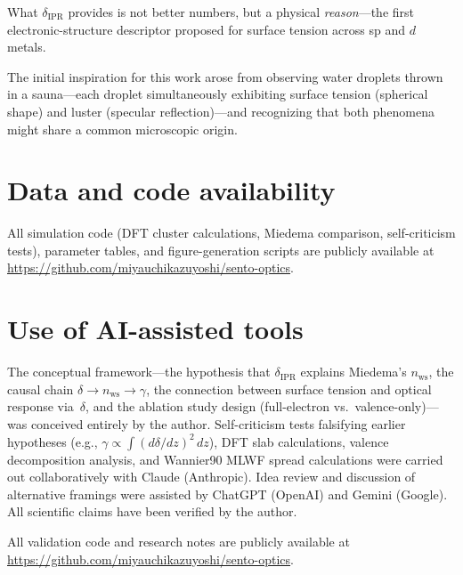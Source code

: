 \documentclass[twocolumn,showpacs,preprintnumbers,amsmath,amssymb,prb]{revtex4-2}
\begin{document}
What $\delta_\mathrm{IPR}$ provides is not better numbers,
but a physical \emph{reason}---the first electronic-structure
descriptor proposed for surface tension across sp and $d$ metals.


\begin{acknowledgments}
The initial inspiration for this work arose from observing
water droplets thrown in a sauna---each droplet simultaneously
exhibiting surface tension (spherical shape) and luster
(specular reflection)---and recognizing that both phenomena
might share a common microscopic origin.
\end{acknowledgments}


\section*{Data and code availability}

All simulation code (DFT cluster calculations, Miedema
comparison, self-criticism tests), parameter tables, and
figure-generation scripts are publicly available at
\url{https://github.com/miyauchikazuyoshi/sento-optics}.


\section*{Use of AI-assisted tools}

The conceptual framework---the hypothesis that
$\delta_\mathrm{IPR}$ explains Miedema's $n_\mathrm{ws}$,
the causal chain $\delta \to n_\mathrm{ws} \to \gamma$,
the connection between surface tension and optical
response via~$\delta$, and the ablation study design
(full-electron vs.\ valence-only)---was conceived
entirely by the author.
Self-criticism tests falsifying earlier hypotheses
(e.g., $\gamma \propto \int(d\delta/dz)^2\,dz$),
DFT slab calculations, valence decomposition analysis,
and Wannier90 MLWF spread calculations
were carried out collaboratively with Claude (Anthropic).
Idea review and discussion of alternative framings
were assisted by ChatGPT (OpenAI) and Gemini (Google).
All scientific claims have been verified by the author.

\noindent All validation code and research notes are publicly available
at \url{https://github.com/miyauchikazuyoshi/sento-optics}.



\end{document}
